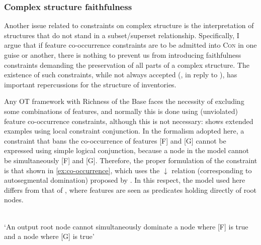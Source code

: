 \subsubsection{Complex structure faithfulness}
\label{sec:compl-struct-faithf}

Another issue related to constraints on complex structure is the interpretation of structures that do not stand in a subset\fshyp superset relationship. Specifically, I argue that if feature co\hyp occurrence constraints are to be admitted into \textsc{Con} in one guise or another, there is nothing to prevent us from introducing faithfulness constraints demanding the preservation of all parts of a complex structure. The existence of such constraints, while not always accepted (\citealp{wolf07:_what_ot}, in reply to \citealp{crowhurst97:_boolean_optim_theor}), has important repercussions for the structure of inventories.

Any OT framework with Richness of the Base faces the necessity of excluding some combinations of features, and normally this is done using (unviolated) feature co\hyp occurrence constraints, although this is not necessary: \citet{moren-serbian,moren-foa} shows extended examples using local constraint conjunction. In the formalism adopted here, a constraint that bans the co\hyp occurrence of features [F] and [G] cannot be expressed using simple logical conjunction, because a node in the model cannot be simultaneously [F] and [G]. Therefore, the proper formulation of the constraint is that shown in \cref{ex:co-occurrence}, which uses the $\downarrow$ relation (corresponding to autosegmental domination) proposed by \citet{potts02:_model_ot}. In this respect, the model used here differs from that of \citet{potts02:_model_ot}, where features are seen as predicates holding directly of root nodes.

\begin{constraint}
  \label{ex:co-occurrence}
  \\
  `An output root node cannot simultaneously dominate a node where [F] is true and a node where [G] is true'
\end{constraint}

